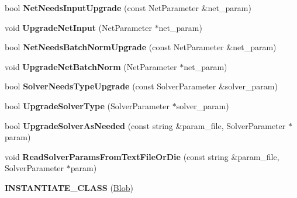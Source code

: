 \begin{DoxyCompactItemize}
\item 
bool {\bfseries Net\+Needs\+Input\+Upgrade} (const Net\+Parameter \&net\+\_\+param)\hypertarget{namespacecaffe_a3a5f01c2593233a787c5170dbfc20e3f}{}\label{namespacecaffe_a3a5f01c2593233a787c5170dbfc20e3f}

\item 
void {\bfseries Upgrade\+Net\+Input} (Net\+Parameter $\ast$net\+\_\+param)\hypertarget{namespacecaffe_a2f8203b685d821d3502f087a01ea23e4}{}\label{namespacecaffe_a2f8203b685d821d3502f087a01ea23e4}

\item 
bool {\bfseries Net\+Needs\+Batch\+Norm\+Upgrade} (const Net\+Parameter \&net\+\_\+param)\hypertarget{namespacecaffe_ac6024e2bed1b4c0e2519150df87b1ed2}{}\label{namespacecaffe_ac6024e2bed1b4c0e2519150df87b1ed2}

\item 
void {\bfseries Upgrade\+Net\+Batch\+Norm} (Net\+Parameter $\ast$net\+\_\+param)\hypertarget{namespacecaffe_a6ba498a85604c9524fdd58f5d32d3145}{}\label{namespacecaffe_a6ba498a85604c9524fdd58f5d32d3145}

\item 
bool {\bfseries Solver\+Needs\+Type\+Upgrade} (const Solver\+Parameter \&solver\+\_\+param)\hypertarget{namespacecaffe_a94c0499a4e250e932475b98a0ed5aba6}{}\label{namespacecaffe_a94c0499a4e250e932475b98a0ed5aba6}

\item 
bool {\bfseries Upgrade\+Solver\+Type} (Solver\+Parameter $\ast$solver\+\_\+param)\hypertarget{namespacecaffe_a84566800a0ee8db1da676cbb8b831c6a}{}\label{namespacecaffe_a84566800a0ee8db1da676cbb8b831c6a}

\item 
bool {\bfseries Upgrade\+Solver\+As\+Needed} (const string \&param\+\_\+file, Solver\+Parameter $\ast$param)\hypertarget{namespacecaffe_a3777408533d54e17e1293ecb711f6ffd}{}\label{namespacecaffe_a3777408533d54e17e1293ecb711f6ffd}

\item 
void {\bfseries Read\+Solver\+Params\+From\+Text\+File\+Or\+Die} (const string \&param\+\_\+file, Solver\+Parameter $\ast$param)\hypertarget{namespacecaffe_a952ac3fd680ae9c565299b7b4bfb8a3d}{}\label{namespacecaffe_a952ac3fd680ae9c565299b7b4bfb8a3d}

\item 
{\bfseries I\+N\+S\+T\+A\+N\+T\+I\+A\+T\+E\+\_\+\+C\+L\+A\+SS} (\hyperlink{classcaffe_1_1Blob}{Blob})\hypertarget{namespacecaffe_a23fdc8cf55ff6d4673e4d6a9379cd478}{}\label{namespacecaffe_a23fdc8cf55ff6d4673e4d6a9379cd478}


\end{DoxyCompactItemize}

